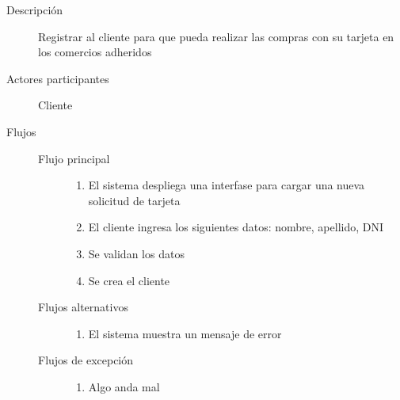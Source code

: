\begin{description}
\item[Descripción] Registrar al cliente para que pueda realizar las compras con su tarjeta en los comercios adheridos
\item[Actores participantes] Cliente
\item[Flujos] \hfill
\begin{description}
\item[Flujo principal] \hfill
\begin{enumerate}
\item El sistema despliega una interfase para cargar una nueva solicitud de tarjeta
\item El cliente ingresa los siguientes datos: nombre, apellido, DNI
\item Se validan los datos
\item Se crea el cliente
\end{enumerate}
\item[Flujos alternativos] \hfill
\begin{enumerate}
\item El sistema muestra un mensaje de error
\end{enumerate}
\item[Flujos de excepción] \hfill
\begin{enumerate}
\item Algo anda mal
\end{enumerate}
\end{description}


\end{description}

